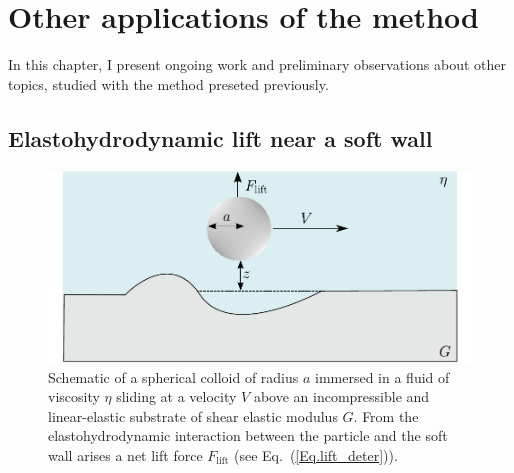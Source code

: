 
\section{Other applications of the method}
\label{chapfin}
In this chapter, I present ongoing work and preliminary observations about other topics, studied with the method preseted previously.

\subsection{Elastohydrodynamic lift near a soft wall}

\begin{figure}[H]
	\centering
	\includegraphics{02_body/chapter4/images/EHD_forces/drawing_system.pdf}
	\caption{Schematic of a spherical colloid of radius $a$  immersed in a fluid of viscosity $\eta$ sliding at a velocity $V$ above an incompressible and linear-elastic substrate of shear elastic modulus $G$. From the elastohydrodynamic interaction between the particle and the soft wall arises a net lift force $F_\mathrm{lift}$ (see Eq.~(\ref{Eq.lift_deter})).}
	\label{fig.shema_EHD}
\end{figure}



